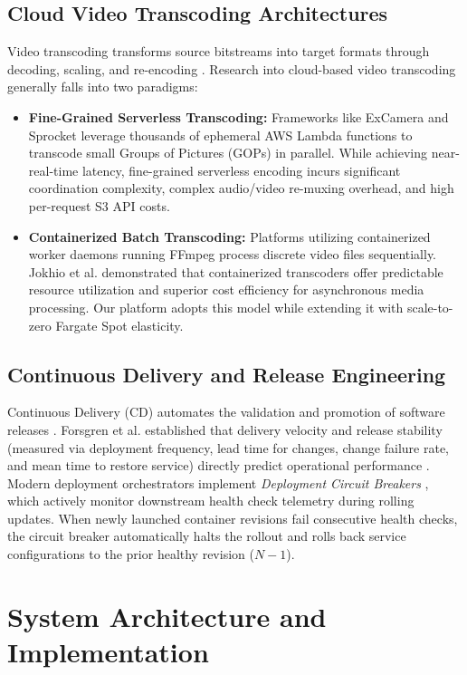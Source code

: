 \documentclass[conference]{IEEEtran}
\begin{document}
\subsection{Cloud Video Transcoding Architectures}
Video transcoding transforms source bitstreams into target formats through decoding, scaling, and re-encoding \cite{wiegand}. Research into cloud-based video transcoding generally falls into two paradigms:
\begin{itemize}
    \item \textbf{Fine-Grained Serverless Transcoding:} Frameworks like ExCamera \cite{fouladi} and Sprocket \cite{ao} leverage thousands of ephemeral AWS Lambda functions to transcode small Groups of Pictures (GOPs) in parallel. While achieving near-real-time latency, fine-grained serverless encoding incurs significant coordination complexity, complex audio/video re-muxing overhead, and high per-request S3 API costs.
    \item \textbf{Containerized Batch Transcoding:} Platforms utilizing containerized worker daemons running FFmpeg \cite{bellard} process discrete video files sequentially. Jokhio et al. \cite{jokhio} demonstrated that containerized transcoders offer predictable resource utilization and superior cost efficiency for asynchronous media processing. Our platform adopts this model while extending it with scale-to-zero Fargate Spot elasticity.
\end{itemize}

\subsection{Continuous Delivery and Release Engineering}
Continuous Delivery (CD) automates the validation and promotion of software releases \cite{humble}. Forsgren et al. established that delivery velocity and release stability (measured via deployment frequency, lead time for changes, change failure rate, and mean time to restore service) directly predict operational performance \cite{forsgren}. Modern deployment orchestrators implement \textit{Deployment Circuit Breakers} \cite{ecs_breaker}, which actively monitor downstream health check telemetry during rolling updates. When newly launched container revisions fail consecutive health checks, the circuit breaker automatically halts the rollout and rolls back service configurations to the prior healthy revision ($N-1$).

\section{System Architecture and Implementation}
\end{document}
